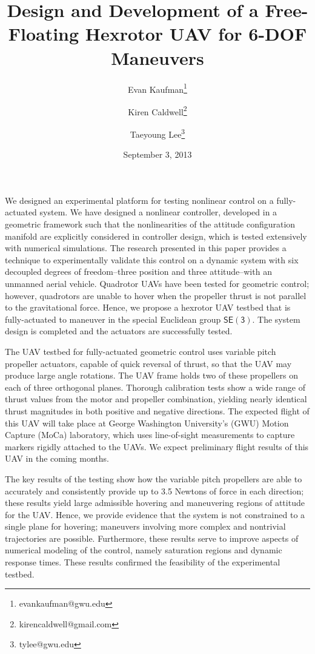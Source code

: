 \documentclass[10pt,a4paper]{article}
\title{Design and Development of a Free-Floating Hexrotor UAV for 6-DOF Maneuvers}
\author{Evan Kaufman\thanks{evankaufman@gwu.edu}}
\author{Kiren Caldwell\thanks{kirencaldwell@gmail.com}}
\author{Taeyoung Lee\thanks{tylee@gwu.edu}}
\affil{Department of Mechanical and Aerospace Engineering, The George Washington University}
\date{September 3, 2013}
\newcommand{\SE}{\ensuremath{\mathsf{SE(3)}}}
\theoremstyle{plain}\theorembodyfont{\normalfont}
\begin{document}
\maketitle
We designed an experimental platform for testing nonlinear control on a fully-actuated system. We have designed a nonlinear controller, developed in a geometric framework such that the nonlinearities of the attitude configuration manifold are explicitly considered in controller design, which is tested extensively with numerical simulations. The research presented in this paper provides a technique to experimentally validate this control on a dynamic system with six decoupled degrees of freedom--three position and three attitude--with an unmanned aerial vehicle. Quadrotor UAVs have been tested for geometric control; however, quadrotors are unable to hover when the propeller thrust is not parallel to the gravitational force. Hence, we propose a hexrotor UAV testbed that is fully-actuated to maneuver in the special Euclidean group $\SE$. The system design is completed and the actuators are successfully tested.

The UAV testbed for fully-actuated geometric control uses variable pitch propeller actuators, capable of quick reversal of thrust, so that the UAV may produce large angle rotations. The UAV frame holds two of these propellers on each of three orthogonal planes. Thorough calibration tests show a wide range of thrust values from the motor and propeller combination, yielding nearly identical thrust magnitudes in both positive and negative directions. The expected flight of this UAV will take place at George Washington University's (GWU) Motion Capture (MoCa) laboratory, which uses line-of-sight measurements to capture markers rigidly attached to the UAVs. We expect preliminary flight results of this UAV in the coming months.

The key results of the testing show how the variable pitch propellers are able to accurately and consistently provide up to 3.5 Newtons of force in each direction; these results yield large admissible hovering and maneuvering regions of attitude for the UAV. Hence, we provide evidence that the system is not constrained to a single plane for hovering; maneuvers involving more complex and nontrivial trajectories are possible. Furthermore, these results serve to improve aspects of numerical modeling of the control, namely saturation regions and dynamic response times. These results confirmed the feasibility of the experimental testbed.
\end{document}
